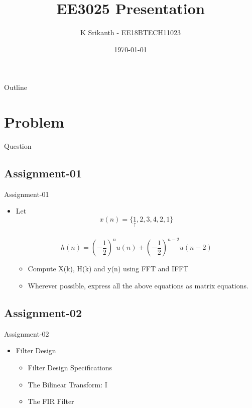 \documentclass{beamer}
\title[EE3025]{EE3025 Presentation}
\author[K Srikanth]{K Srikanth - EE18BTECH11023}
\institute[IITH]{Indian Institute of Technology Hyderabad}
\date{\today}
\begin{document}
\begin{frame}
  \titlepage
\end{frame}

\begin{frame}{Outline}
 \tableofcontents
\end{frame}

\section{Problem}

\begin{frame}{Question}

\subsection{Assignment-01}
Assignment-01
\begin{itemize}
        \item Let \[ x(n) = \{\underset{\uparrow}{1},2,3,4,2,1 \} \]\\
            \[ h(n)=\left(-\frac{1}{2}\right)^{n} u(n)+\left(-\frac{1}{2}\right)^{n-2} u(n-2)\]
            \begin{itemize}
                \item  Compute X(k), H(k) and y(n) using FFT and IFFT 
                \item Wherever possible, express all the above equations as matrix equations.
            \end{itemize}
\end{itemize}
\subsection{Assignment-02}
Assignment-02
\begin{itemize}
    \item Filter Design
    \begin{itemize}
        \item Filter Design Specifications
        \item The Bilinear Transform: I
        \item The FIR Filter
    \end{itemize}
\end{itemize}
\end{frame}
\end{document}
